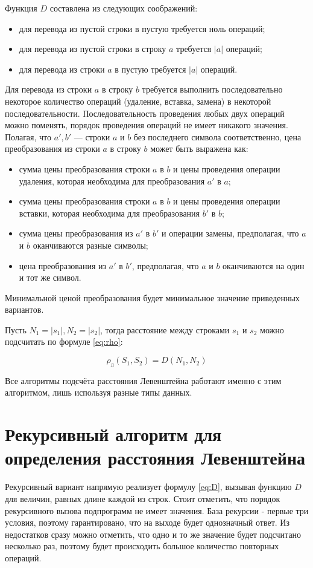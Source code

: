 Функция $D$ составлена из следующих соображений:
\begin{itemize}
	\item для перевода из пустой строки в пустую требуется ноль операций;
	\item для перевода из пустой строки в строку $a$ требуется $|a|$ операций;
	\item для перевода из строки $a$ в пустую требуется $|a|$ операций.
\end{itemize}

Для перевода из строки $a$ в строку $b$ требуется выполнить последовательно некоторое количество операций (удаление, вставка, замена) в некоторой последовательности. Последовательность проведения любых двух операций можно поменять, порядок проведения операций не имеет никакого значения. Полагая, что $a', b'$  — строки $a$ и $b$ без последнего символа соответственно, цена преобразования из строки $a$ в строку $b$ может быть выражена как:
	\begin{itemize}
		\item сумма цены преобразования строки $a$ в $b$ и цены проведения операции удаления, которая необходима для преобразования $a'$ в $a$;
		\item сумма цены преобразования строки $a$ в $b$  и цены проведения операции вставки, которая необходима для преобразования $b'$ в $b$;
		\item сумма цены преобразования из $a'$ в $b'$ и операции замены, предполагая, что $a$ и $b$ оканчиваются разные символы;
		\item цена преобразования из $a'$ в $b'$, предполагая, что $a$ и $b$ оканчиваются на один и тот же символ.
	\end{itemize}

Минимальной ценой преобразования будет минимальное значение приведенных вариантов.

Пусть \begin{math} N_1 = |s_1|, N_2 = |s_2| \end{math}, тогда расстояние между строками $s_{1}$ и $s_{2}$ можно подсчитать по формуле \ref{eq:rho}:

\begin{equation}
	\label{eq:rho}
	\rho_л(S_1, S_2) = D(N_1, N_2)
\end{equation}

Все алгоритмы подсчёта расстояния Левенштейна работают именно с этим алгоритмом, лишь используя разные типы данных.

\section{Рекурсивный алгоритм для определения расстояния Левенштейна}
Рекурсивный вариант напрямую реализует формулу \ref{eq:D}, вызывая функцию $D$ для величин, равных длине каждой из строк. 
Стоит отметить, что порядок рекурсивного вызова подпрограмм не имеет значения. 
База рекурсии - первые три условия, поэтому гарантировано, что на выходе будет однозначный ответ.
Из недостатков сразу можно отметить, что одно и то же значение будет подсчитано несколько раз, поэтому будет происходить большое количество повторных операций.

